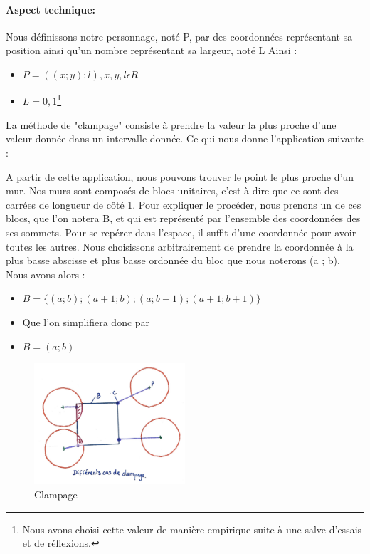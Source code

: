 \documentclass[11pt]{article}
\begin{document}
\paragraph{Aspect technique: }
Nous définissons notre personnage, noté P, par des coordonnées représentant 
sa position ainsi qu'un nombre représentant sa largeur, noté L Ainsi :

\begin{itemize}
	\item[] $P = ((x ; y) ; l), x, y, l \epsilon R$ 
	\item[] $L = 0,1$\footnote{Nous avons choisi cette valeur de manière 
	empirique suite à une salve d'essais et de réflexions.}
\end{itemize}

La méthode de "clampage" consiste à prendre la valeur la plus proche d'une 
valeur donnée dans un intervalle donnée.
Ce qui nous donne l'application suivante :



A partir de cette application, nous pouvons trouver le point le plus proche 
d'un mur. Nos murs sont composés de blocs unitaires, c'est-à-dire que ce 
sont des carrées de longueur de côté 1. Pour expliquer le procéder, nous 
prenons un de ces blocs, que l'on notera B, et qui est représenté par 
l'ensemble des coordonnées des ses sommets. Pour se repérer dans l'espace, 
il suffit d'une coordonnée pour avoir toutes les autres. Nous choisissons 
arbitrairement de prendre la coordonnée à la plus basse abscisse et plus 
basse ordonnée du bloc que nous noterons (a ; b). Nous avons alors :

\begin{itemize}
	\item[]	$B = \{(a ; b) ; (a + 1 ; b) ; (a ; b + 1) ; (a + 1 ; b + 1)\}$
	\item[] Que l'on simplifiera donc par
	\item[] $B = (a ; b)$
\end{itemize}

\begin{figure}
	\centering
	\includegraphics[width=0.5\textwidth]{image/fig4.jpg}
	\caption{Clampage}
	\label{fig:clampage}
\end{figure}
\end{document}
